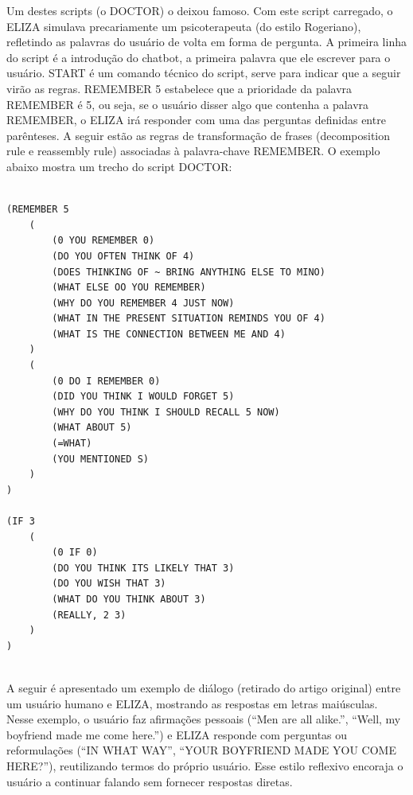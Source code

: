 \documentclass[14pt,a4paper,oneside]{book}
\begin{document}
Um destes scripts (o DOCTOR) o deixou famoso. 
Com este script carregado, o ELIZA simulava precariamente um psicoterapeuta (do estilo Rogeriano), refletindo as palavras do usuário de volta em forma de pergunta. 
A primeira linha do script é a introdução do chatbot, a primeira palavra que ele escrever para o usuário. 
START é um comando técnico do script, serve para indicar que a seguir virão as regras. REMEMBER 5 estabelece que a prioridade da palavra REMEMBER é 5, ou seja, se o usuário disser algo que contenha a palavra REMEMBER, o ELIZA irá responder com uma das perguntas definidas entre parênteses. 
A seguir estão as regras de transformação de frases (decomposition rule e reassembly rule) associadas à palavra-chave REMEMBER. O exemplo abaixo mostra um trecho do script DOCTOR:

\begin{lstlisting}
		
(REMEMBER 5 
	(
		(0 YOU REMEMBER 0) 
		(DO YOU OFTEN THINK OF 4) 
		(DOES THINKING OF ~ BRING ANYTHING ELSE TO MINO) 
		(WHAT ELSE OO YOU REMEMBER)
		(WHY DO YOU REMEMBER 4 JUST NOW) 
		(WHAT IN THE PRESENT SITUATION REMINDS YOU OF 4) 
		(WHAT IS THE CONNECTION BETWEEN ME AND 4)
	) 
	(
		(0 DO I REMEMBER 0) 
		(DID YOU THINK I WOULD FORGET 5) 
		(WHY DO YOU THINK I SHOULD RECALL 5 NOW) 
		(WHAT ABOUT 5) 
		(=WHAT) 
		(YOU MENTIONED S)
	) 
) 

(IF 3 
	(
		(0 IF 0) 
		(DO YOU THINK ITS LIKELY THAT 3) 
		(DO YOU WISH THAT 3) 
		(WHAT DO YOU THINK ABOUT 3) 
		(REALLY, 2 3)
	)
) 
	
\end{lstlisting}

A seguir é apresentado um exemplo de diálogo (retirado do artigo original) entre um usuário humano e ELIZA, mostrando as respostas em letras maiúsculas. Nesse exemplo, o usuário faz afirmações pessoais (“Men are all alike.”, “Well, my boyfriend made me come here.”) e ELIZA responde com perguntas ou reformulações (“IN WHAT WAY”, “YOUR BOYFRIEND MADE YOU COME HERE?”), reutilizando termos do próprio usuário. Esse estilo reflexivo encoraja o usuário a continuar falando sem fornecer respostas diretas.
\end{document}
